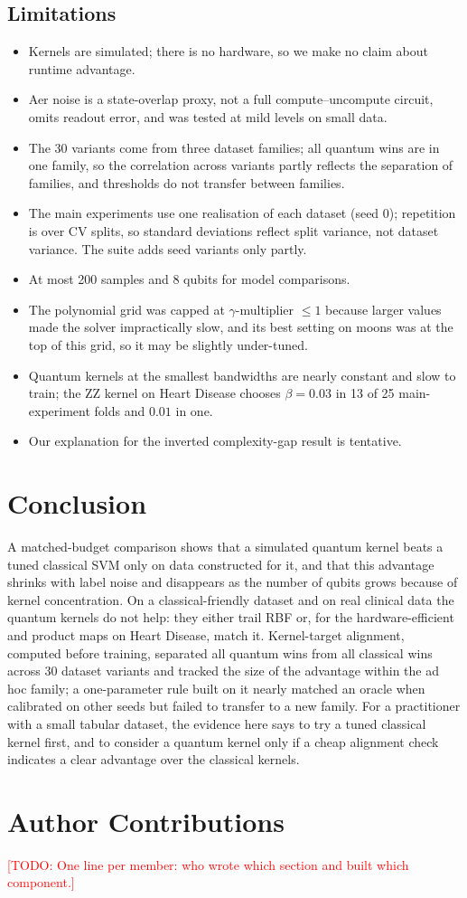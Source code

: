 \documentclass[11pt,a4paper]{article}
\newcommand{\todo}[1]{\textcolor{red}{[TODO: #1]}}
\begin{document}
\subsection{Limitations}
\begin{itemize}
  \item Kernels are simulated; there is no hardware, so we make no claim about runtime advantage.
  \item Aer noise is a state-overlap proxy, not a full compute--uncompute circuit, omits readout error, and was tested at mild levels on small data.
  \item The 30 variants come from three dataset families; all quantum wins are in one family, so the correlation across variants partly reflects the separation of families, and thresholds do not transfer between families.
  \item The main experiments use one realisation of each dataset (seed 0); repetition is over CV splits, so standard deviations reflect split variance, not dataset variance. The suite adds seed variants only partly.
  \item At most 200 samples and 8 qubits for model comparisons.
  \item The polynomial grid was capped at $\gamma$-multiplier $\le 1$ because larger values made the solver impractically slow, and its best setting on moons was at the top of this grid, so it may be slightly under-tuned.
  \item Quantum kernels at the smallest bandwidths are nearly constant and slow to train; the ZZ kernel on Heart Disease chooses $\beta=0.03$ in 13 of 25 main-experiment folds and $0.01$ in one.
  \item Our explanation for the inverted complexity-gap result is tentative.
\end{itemize}

\section{Conclusion}
A matched-budget comparison shows that a simulated quantum kernel beats a tuned classical SVM only on data constructed for it, and that this advantage shrinks with label noise and disappears as the number of qubits grows because of kernel concentration. On a classical-friendly dataset and on real clinical data the quantum kernels do not help: they either trail RBF or, for the hardware-efficient and product maps on Heart Disease, match it. Kernel-target alignment, computed before training, separated all quantum wins from all classical wins across 30 dataset variants and tracked the size of the advantage within the ad hoc family; a one-parameter rule built on it nearly matched an oracle when calibrated on other seeds but failed to transfer to a new family. For a practitioner with a small tabular dataset, the evidence here says to try a tuned classical kernel first, and to consider a quantum kernel only if a cheap alignment check indicates a clear advantage over the classical kernels.

\section*{Author Contributions}
\todo{One line per member: who wrote which section and built which component.}



\end{document}
